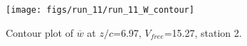 \begin{figure}[H]
\centering
\texttt{[image: figs/run\_11/run\_11\_W\_contour]}
\caption{Contour plot of $\overline{w}$ at $z/c$=6.97, $V_{free}$=15.27, station 2.}
\label{fig:run_11_W_contour}
\end{figure}


